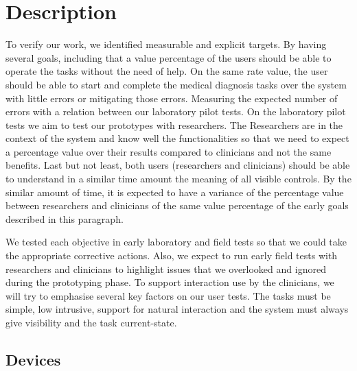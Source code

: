 
\section{Description}
\label{sec:sec003}

To verify our work, we identified measurable and explicit targets. By having several goals, including that a value percentage of the users should be able to operate the tasks without the need of help. On the same rate value, the user should be able to start and complete the medical diagnosis tasks over the system with little errors or mitigating those errors. Measuring the expected number of errors with a relation between our laboratory pilot tests. On the laboratory pilot tests we aim to test our prototypes with researchers. The Researchers are in the context of the system and know well the functionalities so that we need to expect a percentage value over their results compared to clinicians and not the same benefits. Last but not least, both users (researchers and clinicians) should be able to understand in a similar time amount the meaning of all visible controls. By the similar amount of time, it is expected to have a variance of the percentage value between researchers and clinicians of the same value percentage of the early goals described in this paragraph.

We tested each objective in early laboratory and field tests so that we could take the appropriate corrective actions. Also, we expect to run early field tests with researchers and clinicians to highlight issues that we overlooked and ignored during the prototyping phase. To support interaction use by the clinicians, we will try to emphasise several key factors on our user tests. The tasks must be simple, low intrusive, support for natural interaction and the system must always give visibility and the task current-state.

\clearpage


\subsection{Devices}

